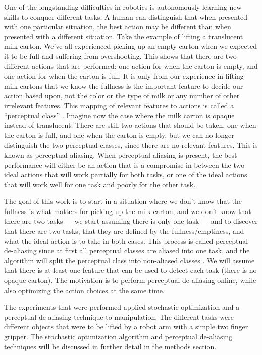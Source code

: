\documentclass[12pt]{article}
\begin{document}
One of the longstanding difficulties in robotics is autonomously learning new skills to conquer different tasks. A human can distinguish that when presented with one particular situation, the best action may be different than when presented with a different situation. Take the example of lifting a translucent milk carton. We've all experienced picking up an empty carton when we expected it to be full and suffering from overshooting. This shows that there are two different actions that are performed: one action for when the carton is empty, and one action for when the carton is full. It is only from our experience in lifting milk cartons that we know the fullness is the important feature to decide our action based upon, not the color or the type of milk or any number of other irrelevant features. This mapping of relevant features to actions is called a ``perceptual class'' \cite{piater}. Imagine now the case where the milk carton is opaque instead of translucent. There are still two actions that should be taken, one when the carton is full, and one when the carton is empty, but we can no longer distinguish the two perceptual classes, since there are no relevant features. This is known as perceptual aliasing. When perceptual aliasing is present, the best performance will either be an action that is a compromise in-between the two ideal actions that will work partially for both tasks, or one of the ideal actions that will work well for one task and poorly for the other task. 

The goal of this work is to start in a situation where we don't know that the fullness is what matters for picking up the milk carton, and we don't know that there are two tasks --- we start assuming there is only one task --- and to discover that there are two tasks, that they are defined by the fullness/emptiness, and what the ideal action is to take in both cases. This process is called perceptual de-aliasing since at first all perceptual classes are aliased into one task, and the algorithm will split the perceptual class into non-aliased classes \cite{daniel}. We will assume that there is at least one feature that can be used to detect each task (there is no opaque carton). The motivation is to perform perceptual de-aliasing online, while also optimizing the action choices at the same time.

The experiments that were performed applied stochastic optimization and a perceptual de-aliasing technique to manipulation. The different tasks were different objects that were to be lifted by a robot arm with a simple two finger gripper. The stochastic optimization algorithm and perceptual de-aliasing techniques will be discussed in further detail in the methods section.
\end{document}
